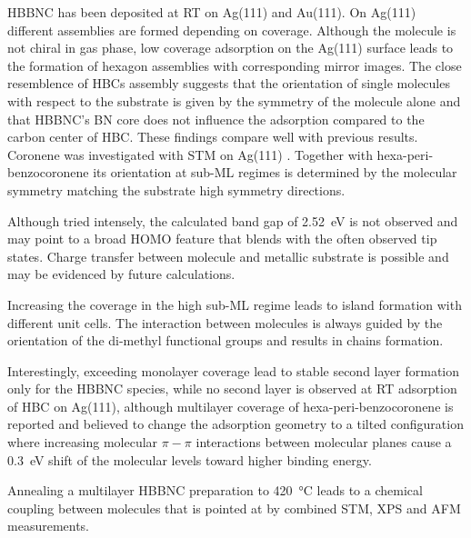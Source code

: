 HBBNC has been deposited at RT on Ag(111) and Au(111). On Ag(111) different assemblies are formed depending on coverage. Although the molecule is not chiral in gas phase, low coverage adsorption on the Ag(111) surface leads to the formation of hexagon assemblies with corresponding mirror images. The close resemblence of HBCs assembly suggests that the orientation of single molecules with respect to the substrate is given by the symmetry of the molecule alone and that HBBNC's BN core does not influence the adsorption compared to the carbon center of HBC. These findings compare well with previous results. Coronene was investigated with STM on Ag(111) \cite{lackinger_coronene_2002, mckinnon_observation_1995}. Together with hexa-peri-benzocoronene its orientation at sub-ML regimes is determined by the molecular symmetry matching the substrate high symmetry directions\cite{zimmermann_epitaxial_1992}.

Although tried intensely, the calculated band gap of \SI{2.52}{\eV} is not observed and may point to a broad HOMO feature that blends with the often observed tip states.
Charge transfer between molecule and metallic substrate is possible and may be evidenced by future calculations.

Increasing the coverage in the high sub-ML regime leads to island formation with different unit cells. The interaction between molecules is always guided by the orientation of the di-methyl functional groups and results in chains formation.

Interestingly, exceeding monolayer coverage lead to stable second layer formation only for the HBBNC species, while no second layer is observed at RT adsorption of HBC on Ag(111), although multilayer coverage of hexa-peri-benzocoronene is reported and believed to change the adsorption geometry to a tilted configuration\cite{zimmermann_epitaxial_1992} where increasing molecular $\pi-\pi$ interactions between molecular planes cause a \SI{0,3}{\eV} shift of the molecular levels toward higher binding energy\cite{glowatzki_hexa-_2008}.

Annealing a multilayer HBBNC preparation to \SI{420}{\celsius} leads to a chemical coupling between molecules that is pointed at by combined STM, XPS and AFM measurements. 
